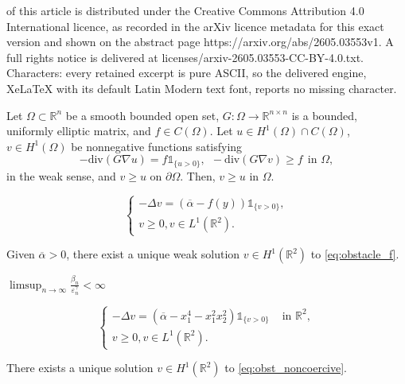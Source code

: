 \documentclass[10pt,a4paper]{amsart}
\newcommand{\RR}{\mathbb{R}}
\newcommand{\divg}{\mathrm{div}}
\begin{document}
of this article is distributed under the Creative Commons Attribution 4.0 International licence, as recorded in the arXiv licence metadata for this exact version and shown on the abstract page https://arxiv.org/abs/2605.03553v1. A full rights notice is delivered at licenses/arxiv-2605.03553-CC-BY-4.0.txt. Characters: every retained excerpt is pure ASCII, so the delivered engine, XeLaTeX with its default Latin Modern text font, reports no missing character.
\begin{lem}
	\label{lem:mp}
	Let $\Omega \subset \RR^{n}$ be a smooth bounded open set, $G: \Omega \rightarrow \RR^{n \times n}$ is a bounded, uniformly elliptic matrix, and $f\in C(\Omega)$. Let $u \in H^{1}(\Omega) \cap C(\Omega)$, $v \in H^{1}(\Omega)$ be nonnegative functions satisfying 
	\[
		- \divg(G\nabla u) = f\mathbb{1}_{\{u>0\}}, ~~ -\divg(G\nabla v)\geq f ~~ \text{in } \Omega,
	\]
	in the weak sense, and $v\geq u$ on $\partial \Omega$. Then, $v\geq u$ in $\Omega$. 
\end{lem}

\begin{equation}
\label{eq:obstacle_f}
	\begin{cases}
		-\Delta v = \left(\overline{\alpha} - f(y)  \right) \mathbb{1}_{\{v > 0\}}, \\
		v \geq 0, v\in L^{1}(\RR^{2}).
	\end{cases}
\end{equation}

\begin{prop}
	\label{prop:existence}
	Given $ \overline{\alpha} > 0 $, there exist a unique weak solution $ v \in H^{1}(\RR^{2}) $ to \eqref{eq:obstacle_f}.
\end{prop}

\begin{prop}
	\label{prop:nondeg_q_bound}
	$ \limsup_{n\rightarrow \infty} \frac{\beta_n}{\varepsilon_n^{\gamma}} < \infty$
\end{prop}

\begin{equation}
\label{eq:obst_noncoercive}
\begin{cases}
	-\Delta v = \left( \overline{\alpha} - x_1^{4} - x_1^{2} x_2^{2} \right) \mathbb{1}_{\{v>0\}} & \text{ in }\RR^{2},\\
	v\geq 0, v\in L^{1}(\RR^{2}). &
\end{cases}
\end{equation}

\begin{prop}
	\label{prop:exist_noncoercive}
	There exists a unique solution $ v \in H^{1}(\RR^{2}) $ to \eqref{eq:obst_noncoercive}.
\end{prop}
\end{document}
